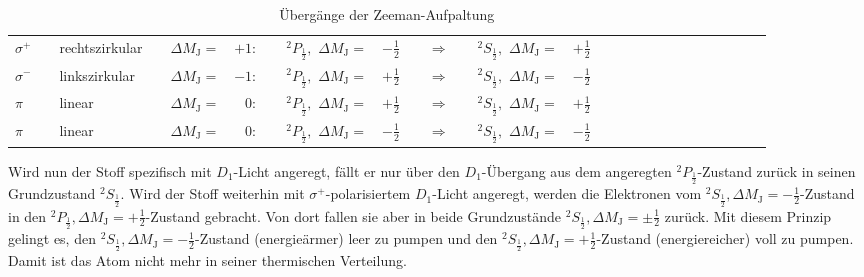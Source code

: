 \begin{table}[h!]
  \centering
  \caption{Übergänge der Zeeman-Aufpaltung}
  \label{tab:polarisation}
  \begin{tabular}{l l l l l r l l r l c l l r l l l l l l l l l l l l}
    \toprule
$\sigma^{+}$ && rechtszirkular && $\Delta M_{\text{J}}=$ & $+1:$  &&  $^{2}P_{\frac{1}{2}},$ $\Delta M_{\text{J}}=$ & $-\frac{1}{2}$ &&$\Rightarrow$&& $^{2}S_{\frac{1}{2}},$ $\Delta M_{\text{J}}=$ & $+\frac{1}{2}$ \\
$\sigma^{-}$ && linkszirkular  && $\Delta M_{\text{J}}=$ & $-1:$  &&  $^{2}P_{\frac{1}{2}},$ $\Delta M_{\text{J}}=$ & $+\frac{1}{2}$  &&$\Rightarrow$&& $^{2}S_{\frac{1}{2}},$ $\Delta M_{\text{J}}=$ & $-\frac{1}{2}$ \\
$\pi       $ && linear         && $\Delta M_{\text{J}}=$ & $ 0:$  &&  $^{2}P_{\frac{1}{2}},$ $\Delta M_{\text{J}}=$ & $+\frac{1}{2}$  &&$\Rightarrow$&& $^{2}S_{\frac{1}{2}},$ $\Delta M_{\text{J}}=$ & $+\frac{1}{2}$ \\
$\pi$        && linear         && $\Delta M_{\text{J}}=$ & $ 0:$  &&  $^{2}P_{\frac{1}{2}},$ $\Delta M_{\text{J}}=$ & $-\frac{1}{2}$ &&$\Rightarrow$&& $^{2}S_{\frac{1}{2}},$ $\Delta M_{\text{J}}=$ & $-\frac{1}{2}$ \\
    \bottomrule
  \end{tabular}
\end{table}
Wird nun der Stoff spezifisch mit $D_{1}$-Licht angeregt, fällt er nur über den $D_{1}$-Übergang aus dem angeregten $^{2}P_{\frac{1}{2}}$-Zustand zurück in seinen Grundzustand $^{2}S_{\frac{1}{2}}$.
Wird der Stoff weiterhin mit $\sigma^{+}$-polarisiertem $D_{1}$-Licht angeregt, werden die Elektronen vom $^{2}S_{\frac{1}{2}}, \Delta M_{\text{J}}= -\frac{1}{2}$-Zustand in den $^{2}P_{\frac{1}{2}}, \Delta M_{\text{J}}= +\frac{1}{2}$-Zustand gebracht.
Von dort fallen sie aber in beide Grundzustände $^{2}S_{\frac{1}{2}}, \Delta M_{\text{J}}= \pm \frac{1}{2}$ zurück.
Mit diesem Prinzip gelingt es, den $^{2}S_{\frac{1}{2}}, \Delta M_{\text{J}}= -\frac{1}{2}$-Zustand (energieärmer) leer zu pumpen und den $^{2}S_{\frac{1}{2}}, \Delta M_{\text{J}}= +\frac{1}{2}$-Zustand (energiereicher) voll zu pumpen.
Damit ist das Atom nicht mehr in seiner thermischen Verteilung.
